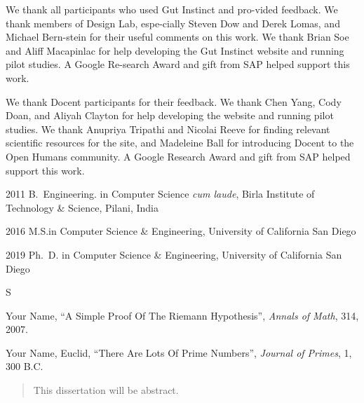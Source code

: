 \begin{frontmatter}
%
\tableofcontents
\listoffigures  %
\listoftables   %



%
%
\begin{acknowledgements}

We thank all participants who used Gut Instinct and pro-vided feedback. We thank members of Design Lab, espe-cially Steven Dow and Derek Lomas, and Michael Bern-stein for their useful comments on this work. We thank Brian Soe and Aliff Macapinlac for help developing the Gut Instinct website and running pilot studies. A Google Re-search Award and gift from SAP helped support this work.

We thank Docent participants for their feedback. We thank Chen Yang, Cody Doan, and Aliyah Clayton for help developing the website and running pilot studies. We thank Anupriya Tripathi and Nicolai Reeve for finding relevant scientific resources for the site, and Madeleine Ball for introducing Docent to the Open Humans community. A Google Research Award and gift from SAP helped support this work.

\end{acknowledgements}


%
%
\begin{vitapage}
\begin{vita}
  \item[2011] B.~Engineering. in Computer Science \emph{cum laude}, Birla Institute of Technology \& Science, Pilani, India
  \item[2016] M.S.in Computer Science \& Engineering, University of California San Diego
  \item[2019] Ph.~D. in Computer Science \& Engineering, University of California San Diego
\end{vita}S
\begin{publications}
  \item Your Name, ``A Simple Proof Of The Riemann Hypothesis'', \emph{Annals of Math}, 314, 2007.
  \item Your Name, Euclid, ``There Are Lots Of Prime Numbers'', \emph{Journal of Primes}, 1, 300 B.C.
\end{publications}
\end{vitapage}


%
%
\begin{abstract}
  This dissertation will be abstract.
\end{abstract}


\end{frontmatter}
